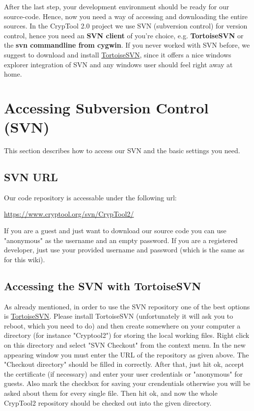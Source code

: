 After the last step, your development environment should be ready for our source-code. Hence, now you need a way of accessing and downloading the entire sources. In the CrypTool 2.0 project we use SVN (subversion control) for version control, hence you need an \textbf{SVN client} of you're choice, e.g. \textbf{TortoiseSVN} or the \textbf{svn commandline from cygwin}. If you never worked with SVN before, we suggest to download and install \href{http://www.tortoisesvn.net/}{TortoiseSVN}, since it offers a nice windows explorer integration of SVN and any windows user should feel right away at home.

\section{Accessing Subversion Control (SVN)}

This section describes how to access our SVN and the basic settings you need.

\subsection*{SVN URL}

Our code repository is accessable under the following url:

\url{https://www.cryptool.org/svn/CrypTool2/}

If you are a guest and just want to download our source code you can use "anonymous" as the username and an empty password. If you are a registered developer, just use your provided username and password (which is the same as for this wiki).

\subsection*{Accessing the SVN with TortoiseSVN}

As already mentioned, in order to use the SVN repository one of the best options is \href{http://www.tortoisesvn.net/}{TortoiseSVN}. Please install TortoiseSVN (unfortunately it will ask you to reboot, which you need to do) and then create somewhere on your computer a directory (for instance "Cryptool2") for storing the local working files. Right click on this directory and select "SVN Checkout" from the context menu. In the new appearing window you must enter the URL of the repository as given above. The "Checkout directory" should be filled in correctly. After that, just hit ok, accept the certificate (if necessary) and enter your user credentials or "anonymous" for guests. Also mark the checkbox for saving your crendentials otherwise you will be asked about them for every single file. Then hit ok, and now the whole CrypTool2 repository should be checked out into the given directory.

